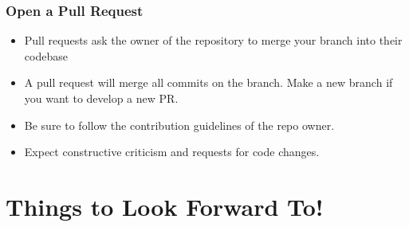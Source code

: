 \documentclass[unknownkeysallowed]{beamer}
\begin{document}
\begin{frame}
    \frametitle{Open a Pull Request}
    \begin{itemize}
        \item{Pull requests ask the owner of the repository to merge your branch into their codebase}
        \item{A pull request will merge all commits on the branch. Make a new branch if you want to develop a new PR.}
        \item{Be sure to follow the contribution guidelines of the repo owner.}
        \item{Expect constructive criticism and requests for code changes.}
    \end{itemize}
\end{frame}

\section{Things to Look Forward To!}
\end{document}
